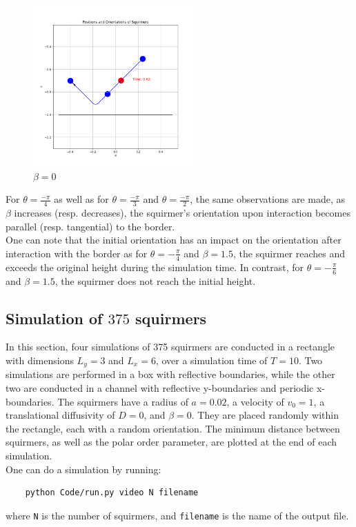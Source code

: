 \documentclass{article}
\begin{document}
\begin{figure}[H]
    \centering
    \includegraphics[width=0.55\textwidth]{graphs/simulations/border/beta0/mpi_4.png}
    \caption{\footnotesize $\beta = 0$}
\end{figure}
For $\theta = \frac{-\pi}{4}$ as well as for $\theta = \frac{-\pi}{3}$ and $\theta = \frac{-\pi}{2}$, 
the same observations are made, as $\beta$ increases (resp. decreases), the squirmer's 
orientation upon interaction becomes parallel (resp. tangential) to the border.\\
One can note that the initial orientation has an impact on the orientation after interaction with the border as for $\theta = -\frac{\pi}{4}$ and 
$\beta = 1.5$, the squirmer reaches and exceeds the original height during the simulation time. In contrast, for $\theta = -\frac{\pi}{6}$ and 
$\beta = 1.5$, the squirmer does not reach the initial height.

\subsection{Simulation of $375$ squirmers}
In this section, four simulations of 375 squirmers are conducted in a rectangle with dimensions $L_y = 3$ and $L_x=6$, over 
a simulation time of $T=10$. Two simulations are performed in a box with reflective boundaries, while the other two are conducted in
 a channel with reflective y-boundaries and periodic x-boundaries.
The squirmers have a radius of $a = 0.02$, a velocity of $v_0 = 1$, a translational diffusivity of $D=0$, and $\beta = 0$.
 They are placed randomly within the rectangle, each with a random orientation. The minimum distance between 
 squirmers, as well as the polar order parameter, are plotted at the end of each simulation.\\
One can do a simulation by running:
\begin{verbatim}
    python Code/run.py video N filename
\end{verbatim} 
where \texttt{N} is the number of squirmers, and \texttt{filename} is the name of the output file.
\end{document}
